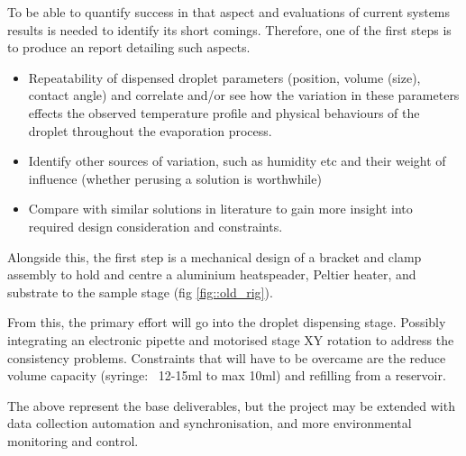 \documentclass[11pt, a4paper, twoside, openright]{report}
\begin{document}
To be able to quantify success in that aspect and evaluations of current systems results is needed to  identify its short comings. Therefore, one of the first steps is to produce an report detailing such aspects.
\begin{itemize}
  \item Repeatability of dispensed droplet parameters (position, volume (size), contact angle) and correlate and/or see how the variation in these parameters effects the observed temperature profile and physical behaviours of the droplet throughout the evaporation process.
  \item Identify other sources of variation, such as humidity etc and their weight of influence (whether perusing a solution is worthwhile)
  \item Compare with similar solutions in literature to gain more insight into required design consideration and constraints.
\end{itemize}

Alongside this, the first step is a mechanical design of a bracket and clamp assembly to hold and centre a aluminium heatspeader, Peltier heater, and substrate to the sample stage (fig \ref{fig::old_rig}).

From this, the primary effort will go into the droplet dispensing stage. Possibly integrating an electronic pipette and motorised stage XY  rotation to address the consistency problems. Constraints that will have to be overcame are the reduce volume capacity (syringe: ~12-15ml to max 10ml) and refilling from a reservoir.

The above represent the base deliverables, but the project may be extended with data collection automation and synchronisation, and more environmental monitoring and control.
\end{document}
